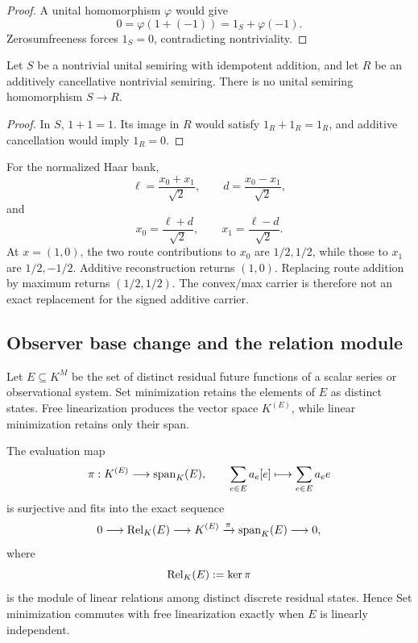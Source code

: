 \begin{proof}
A unital homomorphism \(\varphi\) would give
\[
 0=\varphi(1+(-1))=1_S+\varphi(-1).
\]
Zerosumfreeness forces \(1_S=0\), contradicting nontriviality.
\end{proof}

\begin{theorem}
\label{thm:block18-idempotence-barrier}
Let \(S\) be a nontrivial unital semiring with idempotent addition, and let \(R\) be an additively cancellative nontrivial semiring.  There is no unital semiring homomorphism \(S\to R\).
\end{theorem}

\begin{proof}
In \(S\), \(1+1=1\).  Its image in \(R\) would satisfy \(1_R+1_R=1_R\), and additive cancellation would imply \(1_R=0\).
\end{proof}

\begin{example}
\label{ex:block18-haar-cancellation}
For the normalized Haar bank,
\[
 \ell=\frac{x_0+x_1}{\sqrt2},
 \qquad
 d=\frac{x_0-x_1}{\sqrt2},
\]
and
\[
 x_0=\frac{\ell+d}{\sqrt2},
 \qquad
 x_1=\frac{\ell-d}{\sqrt2}.
\]
At \(x=(1,0)\), the two route contributions to \(x_0\) are \(1/2,1/2\), while those to \(x_1\) are \(1/2,-1/2\).  Additive reconstruction returns \((1,0)\).  Replacing route addition by maximum returns \((1/2,1/2)\).  The convex/max carrier is therefore not an exact replacement for the signed additive carrier.
\end{example}

\subsection{Observer base change and the relation module}
\label{subsec:block18-observer-base-change}

Let \(E\subseteq K^M\) be the set of distinct residual future functions of a scalar series or observational system.  Set minimization retains the elements of \(E\) as distinct states.  Free linearization produces the vector space \(K^{(E)}\), while linear minimization retains only their span.

\begin{theorem}
\label{thm:block18-observer-base-change}
The evaluation map
\[
 \pi:K^{(E)}\longrightarrow\operatorname{span}_K(E),
 \qquad
 \sum_{e\in E}a_e[e]
 \longmapsto
 \sum_{e\in E}a_e e
\]
is surjective and fits into the exact sequence
\[
 0\longrightarrow\operatorname{Rel}_K(E)
 \longrightarrow K^{(E)}
 \xrightarrow{\pi}\operatorname{span}_K(E)
 \longrightarrow0,
\]
where
\[
 \operatorname{Rel}_K(E):=\ker\pi
\]
is the module of linear relations among distinct discrete residual states.  Hence Set minimization commutes with free linearization exactly when \(E\) is linearly independent.
\end{theorem}

